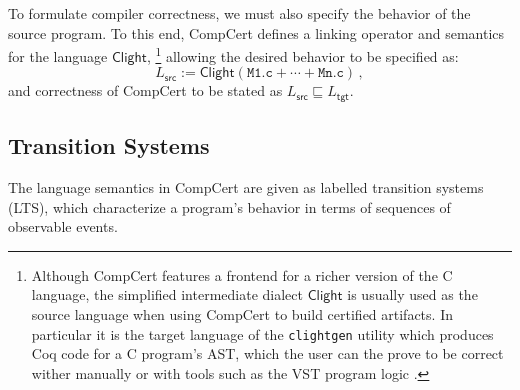 \documentclass[sigplan,10pt,review,anonymous]{acmart}\settopmatter{printfolios=true,printccs=false,printacmref=false}
\newcommand{\kw}[1]{\ensuremath{ \mathsf{#1} }}
\begin{document}
To formulate compiler correctness,
we must also specify the behavior of the source program.
To this end,
CompCert defines a linking operator
and semantics
for the language $\kw{Clight}$,%
\footnote{
  Although CompCert features a frontend for a richer version
  of the C language,
  the simplified intermediate dialect \kw{Clight}
  is usually used as the source language
  when using CompCert to build certified artifacts.
  In particular it is the target language of the
  \texttt{clightgen} utility which
  produces Coq code for a C program's AST,
  which the user can the prove to be correct
  wither manually or with tools such as the VST program logic
  \cite{vst}.
}
allowing the desired behavior to be specified as:
\[
    L_\kw{src} :=
    \kw{Clight}(\texttt{M1.c} + \cdots + \texttt{Mn.c}) \,,
\]
and correctness of CompCert
to be stated as $L_\kw{src} \sqsubseteq L_\kw{tgt}$.


\subsection{Transition Systems} \label{sec:sem:closed} %

The language semantics in CompCert are
given as labelled transition systems (LTS),
which characterize a program's behavior in terms of
sequences of observable events.
\end{document}
